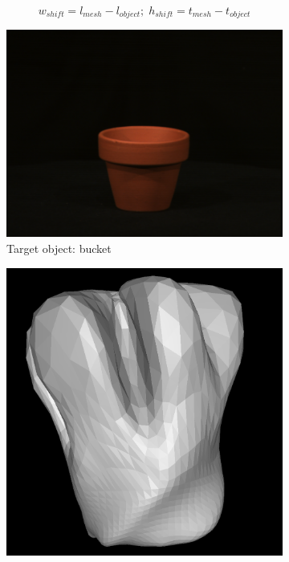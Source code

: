 \documentclass{article}
\begin{document}
\[w_{shift} = l_{mesh} - l_{object} ;\; h_{shift} = t_{mesh} - t_{object}\]

\begin{figure}[h!]
  \centering
  \begin{subfigure}{0.4\textwidth}
    \centering
      \includegraphics[width=\textwidth]{images/bucket.png}
      \caption{Target object: bucket}
      \label{bucket}
  \end{subfigure}
  \hfill
  \begin{subfigure}{0.25\textwidth}
    \centering
      \includegraphics[width=\textwidth]{images/bucketartefact_b.png}

\end{subfigure}
\end{figure}
\end{document}
